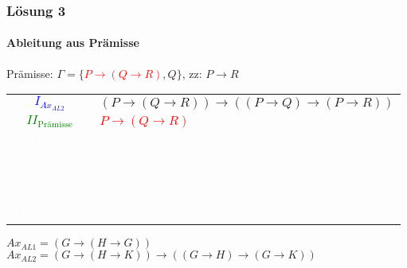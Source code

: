 \begin{frame}
	\frametitle{Lösung 3}
	\framesubtitle{Ableitung aus Prämisse}
	Prämisse: $\Gamma =\{$\textcolor{red}{$P\rightarrow(Q\rightarrow R)$}$, Q\}$, zz: $P\rightarrow R$\\
	\begin{tabular}{cl}
		\textcolor{blue}{$I_{Ax_{AL2}}$}          & $(P\rightarrow(Q\rightarrow R))\rightarrow((P\rightarrow Q)\rightarrow(P\rightarrow R))$ \\
		\textcolor{green}{$II_{\text{Prämisse}}$} & \textcolor{red}{$P\rightarrow(Q\rightarrow R)$}                                          \\
		\textcolor{white}{$III_{MP(I, II)}$}      & \textcolor{white}{$(P\rightarrow Q)\rightarrow(P\rightarrow R)$}                         \\
		\textcolor{white}{$IV_{\text{Prämisse}}$} & \textcolor{white}{$Q$}                                                                   \\
		\textcolor{white}{$V_{IV, Ax_{AL1}}$}     & \textcolor{white}{$Q\rightarrow(P\rightarrow Q)$}                                        \\
		\textcolor{white}{$VI_{MP(IV, V)}$}       & \textcolor{white}{$P\rightarrow Q$}                                                      \\
		\textcolor{white}{$VII_{MP(III, VI)}$}    & \textcolor{white}{$P\rightarrow R$}                                                      \\
	\end{tabular}
	$Ax_{AL1} = (G\rightarrow(H\rightarrow G))$\\
	$Ax_{AL2} = (G\rightarrow(H\rightarrow K))\rightarrow((G\rightarrow H)\rightarrow(G\rightarrow K))$\\
\end{frame}
